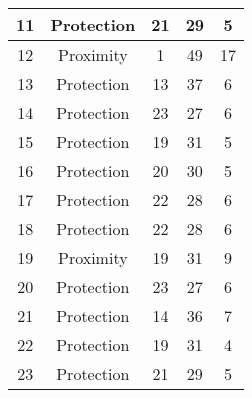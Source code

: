 \documentclass[results.tex]{subfiles}
\begin{document}
\begin{center}
\begin{tabular}{| c || c | c | c | c |}
            \hline
            11                      & Protection                   & 21                     & 29                      & 5                    \\
            \hline
            12                      & Proximity                    & 1                      & 49                      & 17                   \\
            \hline
            13                      & Protection                   & 13                     & 37                      & 6                    \\
            \hline
            14                      & Protection                   & 23                     & 27                      & 6                    \\
            \hline
            15                      & Protection                   & 19                     & 31                      & 5                    \\
            \hline
            16                      & Protection                   & 20                     & 30                      & 5                    \\
            \hline
            17                      & Protection                   & 22                     & 28                      & 6                    \\
            \hline
            18                      & Protection                   & 22                     & 28                      & 6                    \\
            \hline
            19                      & Proximity                    & 19                     & 31                      & 9                    \\
            \hline
            20                      & Protection                   & 23                     & 27                      & 6                    \\
            \hline
            21                      & Protection                   & 14                     & 36                      & 7                    \\
            \hline
            22                      & Protection                   & 19                     & 31                      & 4                    \\
            \hline
            23                      & Protection                   & 21                     & 29                      & 5                    \\

\end{tabular}
\end{center}
\end{document}
